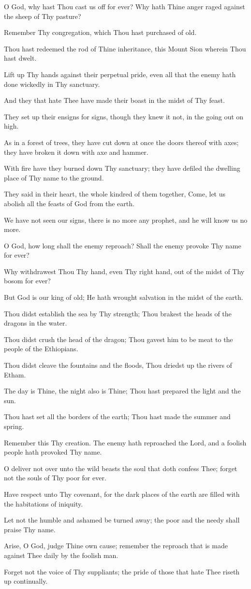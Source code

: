 O God, why hast Thou cast us off for ever? Why hath Thine anger raged against the sheep of Thy pasture?

Remember Thy congregation, which Thou hast purchased of old.

Thou hast redeemed the rod of Thine inheritance, this Mount Sion wherein Thou hast dwelt.

Lift up Thy hands against their perpetual pride, even all that the enemy hath done wickedly in Thy sanctuary.

And they that hate Thee have made their boast in the midst of Thy feast.

They set up their ensigns for signs, though they knew it not, in the going out on high.

As in a forest of trees, they have cut down at once the doors thereof with axes; they have broken it down with axe and hammer.

With fire have they burned down Thy sanctuary; they have defiled the dwelling place of Thy name to the ground.

They said in their heart, the whole kindred of them together, Come, let us abolish all the feasts of God from the earth.

We have not seen our signs, there is no more any prophet, and he will know us no more.

O God, how long shall the enemy reproach? Shall the enemy provoke Thy name for ever?

Why withdrawest Thou Thy hand, even Thy right hand, out of the midst of Thy bosom for ever?

But God is our king of old; He hath wrought salvation in the midst of the earth.

Thou didst establish the sea by Thy strength; Thou brakest the heads of the dragons in the water.

Thou didst crush the head of the dragon; Thou gavest him to be meat to the people of the Ethiopians.

Thou didst cleave the fountains and the floods, Thou driedst up the rivers of Etham.

The day is Thine, the night also is Thine; Thou hast prepared the light and the sun.

Thou hast set all the borders of the earth; Thou hast made the summer and spring.

Remember this Thy creation. The enemy hath reproached the Lord, and a foolish people hath provoked Thy name.

O deliver not over unto the wild beasts the soul that doth confess Thee; forget not the souls of Thy poor for ever.

Have respect unto Thy covenant, for the dark places of the earth are filled with the habitations of iniquity.

Let not the humble and ashamed be turned away; the poor and the needy shall praise Thy name.

Arise, O God, judge Thine own cause; remember the reproach that is made against Thee daily by the foolish man.

Forget not the voice of Thy suppliants; the pride of those that hate Thee riseth up continually.

